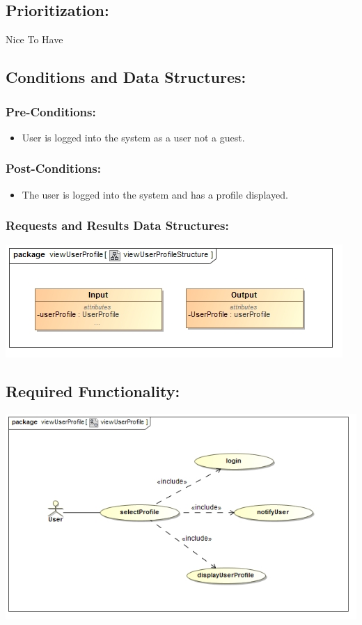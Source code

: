 \documentclass[a4paper,11pt]{article}
\begin{document}
\subsection{Prioritization:} 
\textbf{}Nice To Have
\subsection{Conditions and Data Structures:}
\subsubsection*{Pre-Conditions:}
\begin{itemize}
\item User is logged into the system as a user not a guest. 
\end{itemize}
\subsubsection*{Post-Conditions:}
\begin{itemize}
\item The user is logged into the system and has a profile displayed.
\end{itemize}
\subsubsection*{Requests and Results Data Structures:}
\includegraphics[width=1\linewidth]{./Images/UserProfile/ViewUserProfileStructure}
\subsection{Required Functionality:} 
\includegraphics[width=1\linewidth]{./Images/UserProfile/ViewUserProfileUseCase}
\end{document}
